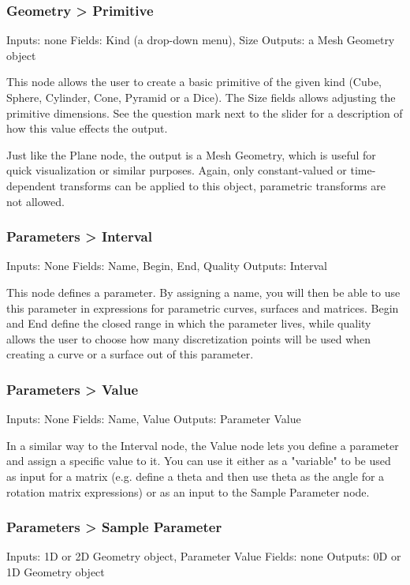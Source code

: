 \subsubsection{Geometry > Primitive}
Inputs: none
Fields: Kind (a drop-down menu), Size
Outputs: a Mesh Geometry object

This node allows the user to create a basic primitive of the given kind
(Cube, Sphere, Cylinder, Cone, Pyramid or a Dice). The Size fields allows
adjusting the primitive dimensions. See the question mark next to the 
slider for a description of how this value effects the output.

Just like the Plane node, the output is a Mesh Geometry, which is useful
for quick visualization or similar purposes. Again, only constant-valued
or time-dependent transforms can be applied to this object,
parametric transforms are not allowed.

\subsubsection{Parameters > Interval}
Inputs: None
Fields: Name, Begin, End, Quality
Outputs: Interval

This node defines a parameter. By assigning a name, you will then be able
to use this parameter in expressions for parametric curves, surfaces and matrices.
Begin and End define the closed range in which the parameter lives, while quality
allows the user to choose how many discretization points will be used when creating
a curve or a surface out of this parameter.

\subsubsection{Parameters > Value}
Inputs: None
Fields: Name, Value
Outputs: Parameter Value

In a similar way to the Interval node, the Value node lets you define a parameter
and assign a specific value to it. You can use it either as a "variable"
to be used as input for a matrix (e.g. define a theta and then use theta as the
angle for a rotation matrix expressions) or as an input to the Sample Parameter node.

\subsubsection{Parameters > Sample Parameter}
Inputs: 1D or 2D Geometry object, Parameter Value
Fields: none
Outputs: 0D or 1D Geometry object

